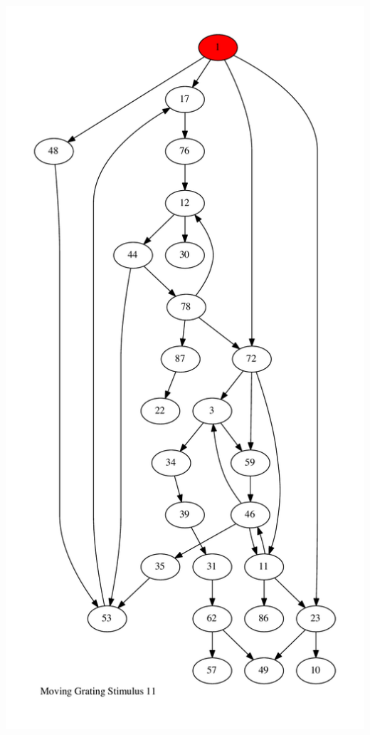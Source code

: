 \documentclass{article}
\begin{document}
\newpage
\includegraphics[max height=\textheight,max width=\textwidth]{stim_mov_grat/stim11_pp.pdf}
\end{document}
